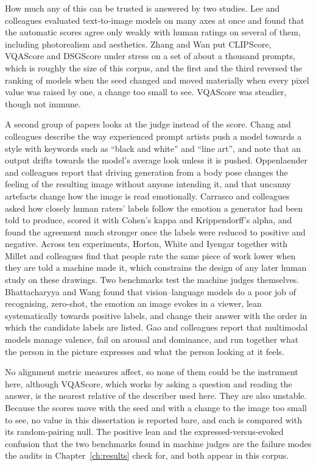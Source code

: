 How much any of this can be trusted is answered by two studies. Lee and colleagues \cite{lee2023holistic} evaluated text-to-image models on many axes at once and found that the automatic scores agree only weakly with human ratings on several of them, including photorealism and aesthetics. Zhang and Wan \cite{zhang2025rethinking} put CLIPScore, VQAScore and DSGScore under stress on a set of about a thousand prompts, which is roughly the size of this corpus, and the first and the third reversed the ranking of models when the seed changed and moved materially when every pixel value was raised by one, a change too small to see. VQAScore was steadier, though not immune.

A second group of papers looks at the judge instead of the score. Chang and colleagues \cite{chang2023prompt} describe the way experienced prompt artists push a model towards a style with keywords such as ``black and white'' and ``line art'', and note that an output drifts towards the model's average look unless it is pushed. Oppenlaender and colleagues \cite{oppenlaender2024artworks} report that driving generation from a body pose changes the feeling of the resulting image without anyone intending it, and that uncanny artefacts change how the image is read emotionally. Carrasco and colleagues \cite{carrasco2024level} asked how closely human raters' labels follow the emotion a generator had been told to produce, scored it with Cohen's kappa and Krippendorff's alpha, and found the agreement much stronger once the labels were reduced to positive and negative. Across ten experiments, Horton, White and Iyengar \cite{horton2023bias} together with Millet and colleagues \cite{millet2023defending} find that people rate the same piece of work lower when they are told a machine made it, which constrains the design of any later human study on these drawings. Two benchmarks test the machine judges themselves. Bhattacharyya and Wang \cite{bhattacharyya2025evaluating} found that vision--language models do a poor job of recognising, zero-shot, the emotion an image evokes in a viewer, lean systematically towards positive labels, and change their answer with the order in which the candidate labels are listed. Gao and colleagues \cite{gao2025eemo} report that multimodal models manage valence, fail on arousal and dominance, and run together what the person in the picture expresses and what the person looking at it feels.

No alignment metric measures affect, so none of them could be the instrument here, although VQAScore, which works by asking a question and reading the answer, is the nearest relative of the describer used here. They are also unstable. Because the scores move with the seed and with a change to the image too small to see, no value in this dissertation is reported bare, and each is compared with its random-pairing null. The positive lean and the expressed-versus-evoked confusion that the two benchmarks found in machine judges are the failure modes the audits in Chapter~\ref{ch:results} check for, and both appear in this corpus.

